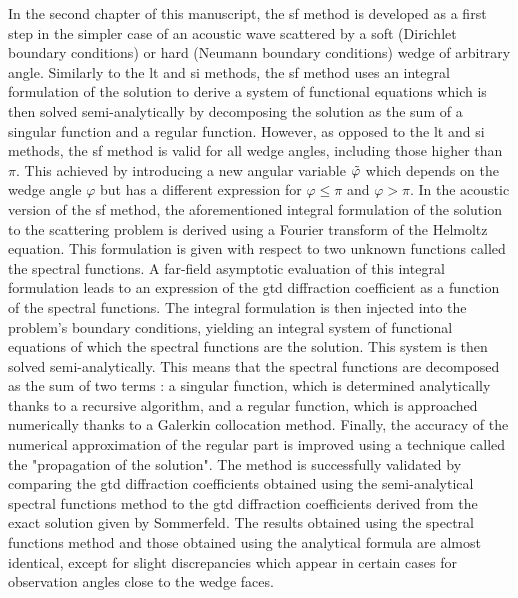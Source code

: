 In the second chapter of this manuscript, the \acrfull{sf} method is developed as a first step in the simpler case of an acoustic wave scattered by a soft (Dirichlet boundary conditions) or hard (Neumann boundary conditions) wedge of arbitrary angle. Similarly to the \acrshort{lt} and \acrshort{si} methods, the \acrshort{sf} method uses an integral formulation of the solution to derive a system of functional equations which is then solved semi-analytically by decomposing the solution as the sum of a singular function and a regular function. However, as opposed to the \acrshort{lt} and \acrshort{si} methods, the \acrshort{sf} method is valid for all wedge angles, including those higher than $\pi$. This achieved by introducing a new angular variable $\tilde{\varphi}$ which depends on the wedge angle $\varphi$ but has a different expression for $\varphi \leq \pi$ and $\varphi>\pi$. In the acoustic version of the \acrshort{sf} method, the aforementioned integral formulation of the solution to the scattering problem is derived using a Fourier transform of the Helmoltz equation. This formulation is given with respect to two unknown functions called the spectral functions. A far-field asymptotic evaluation of this integral formulation leads to an expression of the \acrshort{gtd} diffraction coefficient as a function of the spectral functions. The integral formulation is then injected into the problem's boundary conditions, yielding an integral system of functional equations of which the spectral functions are the solution. This system is then solved semi-analytically. This means that the spectral functions are decomposed as the sum of two terms : a singular function, which is determined analytically thanks to a recursive algorithm, and a regular function, which is approached numerically thanks to a Galerkin collocation method. Finally, the accuracy of the numerical approximation of the regular part is improved using a technique called the "propagation of the solution". The method is successfully validated by comparing the \acrshort{gtd} diffraction coefficients obtained using the semi-analytical spectral functions method to the \acrshort{gtd} diffraction coefficients derived from the exact solution given by Sommerfeld. The results obtained using the spectral functions method and those obtained using the analytical formula are almost identical, except for slight discrepancies which appear in certain cases for observation angles close to the wedge faces.

